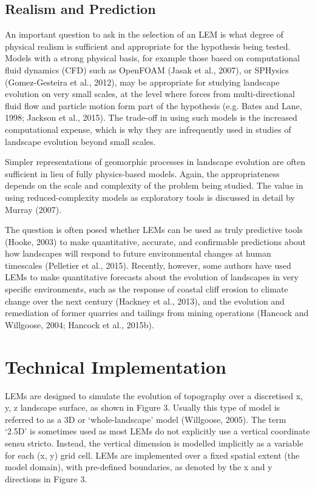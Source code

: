 \subsection{Realism and Prediction}

An important question to ask in the selection of an LEM is what degree of physical realism is sufficient and appropriate for the hypothesis being tested. Models with a strong physical basis, for example those based on computational fluid dynamics (CFD) such as OpenFOAM (Jasak et al., 2007), or SPHysics (Gomez-Gesteira et al., 2012), may be appropriate for studying landscape evolution on very small scales, at the level where forces from multi-directional fluid flow and particle motion form part of the hypothesis (e.g. Bates and Lane, 1998; Jackson et al., 2015). The trade-off in using such models is the increased computational expense, which is why they are infrequently used in studies of landscape evolution beyond small scales.

Simpler representations of geomorphic processes in landscape evolution are often sufficient in lieu of fully physics-based models. Again, the appropriateness depends on the scale and complexity of the problem being studied. The value in using reduced-complexity models as exploratory tools is discussed in detail by Murray (2007). 

The question is often posed whether LEMs can be used as truly predictive tools (Hooke, 2003) to make quantitative, accurate, and confirmable predictions about how landscapes will respond to future environmental changes at human timescales (Pelletier et al., 2015). Recently, however, some authors have used LEMs to make quantitative forecasts about the evolution of landscapes in very specific environments, such as the response of coastal cliff erosion to climate change over the next century (Hackney et al., 2013), and the evolution and remediation of former quarries and tailings from mining operations (Hancock and Willgoose, 2004; Hancock et al., 2015b).

\section{Technical Implementation}
LEMs are designed to simulate the evolution of topography over a discretised x, y, z landscape surface, as shown in Figure 3. Usually this type of model is referred to as a 3D or ‘whole-landscape’ model (Willgoose, 2005). The term ‘2.5D’ is sometimes used as most LEMs do not explicitly use a vertical coordinate sensu stricto. Instead, the vertical dimension is modelled implicitly as a variable for each (x, y) grid cell. LEMs are implemented over a fixed spatial extent (the model domain), with pre-defined boundaries, as denoted by the x and y directions in Figure 3. 

